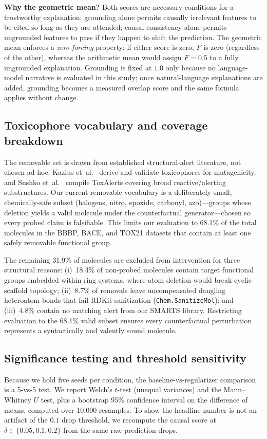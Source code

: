 \documentclass[a4paper,fleqn]{cas-dc}
\begin{document}
\textbf{Why the geometric mean?} Both scores are necessary conditions for a trustworthy explanation: grounding alone permits causally irrelevant features to be cited so long as they are attended; causal consistency alone permits ungrounded features to pass if they happen to shift the prediction. The geometric mean enforces a \emph{zero-forcing} property: if either score is zero, $F$ is zero (regardless of the other), whereas the arithmetic mean would assign $F=0.5$ to a fully ungrounded explanation. Grounding is fixed at $1.0$ only because no language-model narrative is evaluated in this study; once natural-language explanations are added, grounding becomes a measured overlap score and the same formula applies without change.

\subsection{Toxicophore vocabulary and coverage breakdown}
The removable set is drawn from established structural-alert literature, not chosen ad hoc: Kazius et~al.~\cite{kazius2005derivation} derive and validate toxicophores for mutagenicity, and Sushko et~al.~\cite{sushko2012toxalerts} compile ToxAlerts covering broad reactive/alerting substructures. Our current removable vocabulary is a deliberately small, chemically-safe subset (halogens, nitro, epoxide, carbonyl, azo)---groups whose deletion yields a valid molecule under the counterfactual generator---chosen so every probed claim is falsifiable. This limits our evaluation to 68.1\% of the total molecules in the BBBP, BACE, and TOX21 datasets that contain at least one safely removable functional group.

The remaining 31.9\% of molecules are excluded from intervention for three structural reasons: (i)~18.4\% of non-probed molecules contain target functional groups embedded within ring systems, where atom deletion would break cyclic scaffold topology; (ii)~8.7\% of removals leave uncompensated dangling heteroatom bonds that fail RDKit sanitization (\texttt{Chem.SanitizeMol}); and (iii)~4.8\% contain no matching alert from our SMARTS library. Restricting evaluation to the 68.1\% valid subset ensures every counterfactual perturbation represents a syntactically and valently sound molecule.

\subsection{Significance testing and threshold sensitivity}
Because we hold five seeds per condition, the baseline-vs-regularizer comparison is a 5-vs-5 test. We report Welch's $t$-test (unequal variances) and the Mann--Whitney $U$ test, plus a bootstrap 95\% confidence interval on the difference of means, computed over 10,000 resamples. To show the headline number is not an artifact of the $0.1$ drop threshold, we recompute the causal score at $\delta \in \{0.05, 0.1, 0.2\}$ from the same raw prediction drops.
\end{document}
